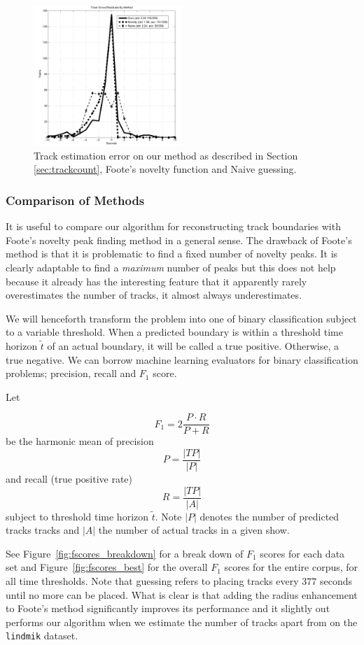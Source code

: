 \documentclass[twocolumn]{article}
\begin{document}
\begin{figure}
	\centering
	\includegraphics[width=0.5\textwidth]{images/trackshift}
	\caption{Track estimation error on our method as described in Section \ref{sec:trackcount}, Foote's novelty function and Naive guessing. }
	\label{fig:track_shift}
\end{figure}

\subsubsection{Comparison of Methods}

It is useful to compare our algorithm for reconstructing track boundaries with Foote's novelty peak finding method in a general sense. The drawback of Foote's method is that it is problematic to find a fixed number of novelty peaks. It is clearly adaptable to find a \textit{maximum} number of peaks but this does not help because it already has the interesting feature that it apparently rarely overestimates the number of tracks, it almost always underestimates.

We will henceforth transform the problem into one of binary classification subject to a variable threshold. When a predicted boundary is within a threshold time horizon $\tilde t$ of an actual boundary, it will be called a true positive. Otherwise, a true negative. We can borrow machine learning evaluators for binary classification problems; precision, recall and $F_1$ score.

Let

\[
F_1 = 2\frac{P \cdot R}{P+R}
\] be the harmonic mean of precision 
\[
P = \frac{|TP|}{|P|}
\]
 and recall (true positive rate)
\[
R=\frac{|TP|}{|A|}
\] subject to threshold time horizon $\tilde t$. Note $|P|$ denotes the number of predicted tracks tracks and $|A|$ the number of actual tracks in a given show.

See Figure~\ref{fig:fscores_breakdown} for a break down of $F_1$ scores for each data set and Figure~\ref{fig:fscores_best} for the overall $F_1$ scores for the entire corpus, for all time thresholds. Note that guessing refers to placing tracks every $377$ seconds until no more can be placed. What is clear is that adding the radius enhancement to Foote's method significantly improves its performance and it slightly out performs our algorithm when we estimate the number of tracks apart from on the \texttt{lindmik} dataset. 
\end{document}
